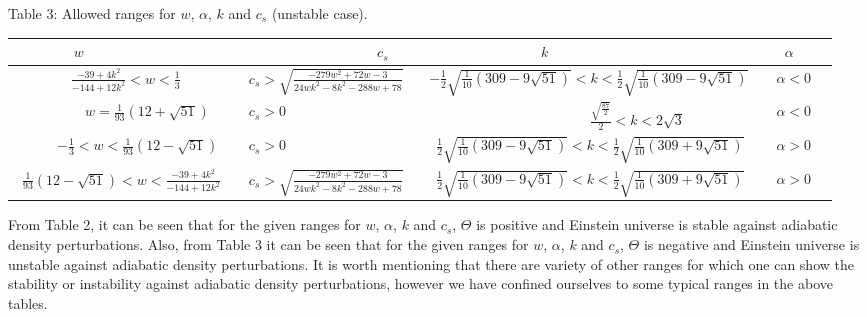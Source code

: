\documentclass[showpacs,amsmath,nofootinbib,amssymb,epsfig]{revtex4}
\begin{document}
\begin{center}
{\scriptsize{ Table 3: }}\hspace{-2mm} {\scriptsize Allowed ranges for $w$, $\alpha$, $k$ and $c_s$ (unstable case).}\\
    \begin{tabular}{|l| l |l |l|  p{800mm} }
    \hline
   {\footnotesize$~~~~~~~~~~~~~~~~~~~w$ }& ~~{\footnotesize~~~~~~~~~~~~~~~ $c_s$ }&~~ {\footnotesize$~~~~~~~~~~~~~~~~~~~~~~~~~~~~~~~~~k$ }& ~~{\footnotesize$~~\alpha$ } \\ \hline
{\footnotesize ~~~~~~~~$\frac{-39+4k^{2}}{-144+12k^{2}}<w<\frac{1}{3} $} & ~~{\footnotesize $c_s>\sqrt{\frac{-279 w^2+72 w-3}{24 w k^2-8 k^2-288 w+78}}$}&~ {\footnotesize $-\frac{1}{2} \sqrt{\frac{1}{10} \left(309-9
   \sqrt{51}\right)}<k<\frac{1}{2} \sqrt{\frac{1}{10} \left(309-9
   \sqrt{51}\right)}$}& ~~{\footnotesize$\alpha<0$ } \\\hline
 {\footnotesize ~~~~~~~~~~$w=\frac{1}{93}(12+\sqrt{51})  $} & ~~{\footnotesize $c_s>0$}&~ {\footnotesize ~~~~~~~~~~~~~~~~~~~~~~~$\frac{\sqrt{\frac{87}{2}}}{2}<k<2 \sqrt{3}$}& ~~{\footnotesize$\alpha<0$ }
\\ \hline
{\footnotesize ~~~~~~$-\frac{1}{3}<w<\frac{1}{93}(12-\sqrt{51})  $} & ~~{\footnotesize $c_s>0$}&~ {\footnotesize ~$\frac{1}{2} \sqrt{\frac{1}{10} \left(309-9 \sqrt{51}\right)}<k<\frac{1}{2} \sqrt{\frac{1}{10} \left(309+9 \sqrt{51}\right)}$}& ~~{\footnotesize$\alpha>0$ } \\\hline
 {\footnotesize ~$\frac{1}{93}(12-\sqrt{51})<w<\frac{-39+4k^{2}}{-144+12k^{2}} $} & ~~{\footnotesize $c_s>\sqrt{\frac{-279 w^2+72 w-3}{24 w k^2-8 k^2-288 w+78}}$}&~ {\footnotesize ~$\frac{1}{2} \sqrt{\frac{1}{10} \left(309-9 \sqrt{51}\right)}<k<\frac{1}{2} \sqrt{\frac{1}{10} \left(309+9 \sqrt{51}\right)}$}& ~~{\footnotesize$\alpha>0$ }
\\ \hline
    \end{tabular}
\end{center}

From Table 2, it can be seen that for the given ranges for $w$, $\alpha$, $k$ and $c_s$, $\Theta$ is positive and Einstein universe is stable against adiabatic density perturbations. Also, from Table 3 it can be seen that for the given ranges for $w$, $\alpha$, $k$ and $c_s$, $\Theta$ is negative and Einstein universe is unstable against adiabatic density perturbations.
It is worth mentioning that there are variety of other ranges for which one
can show the stability or instability against adiabatic density perturbations,
however we have confined ourselves to some typical ranges in the above tables.
\end{document}
